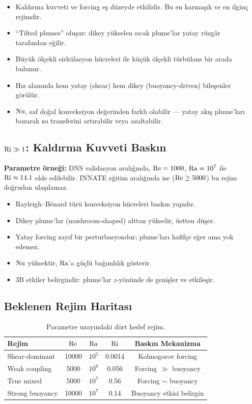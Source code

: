 \begin{itemize}
    \item Kaldırma kuvveti ve forcing eş düzeyde etkilidir. Bu en karmaşık ve en ilginç rejimdir.
    \item ``Tilted plumes'' oluşur: dikey yükselen sıcak plume'lar yatay rüzgâr tarafından eğilir.
    \item Büyük ölçekli sirkülasyon hücreleri ile küçük ölçekli türbülans bir arada bulunur.
    \item Hız alanında hem yatay (shear) hem dikey (buoyancy-driven) bileşenler görülür.
    \item $\mathrm{Nu}$, saf doğal konveksiyon değerinden farklı olabilir --- yatay akış plume'ları bozarak ısı transferini artırabilir veya azaltabilir.
\end{itemize}

\subsection{$\mathrm{Ri} \gg 1$: Kaldırma Kuvveti Baskın}

\textbf{Parametre örneği:} DNS validasyon aralığında, $\mathrm{Re} = 1000$, $\mathrm{Ra} = 10^7$ ile $\mathrm{Ri} \approx 14.1$ elde edilebilir. INNATE eğitim aralığında ise ($\mathrm{Re} \geq 5000$) bu rejim doğrudan ulaşılamaz.

\begin{itemize}
    \item Rayleigh--B\'{e}nard türü konveksiyon hücreleri baskın yapıdır.
    \item Dikey plume'lar (mushroom-shaped) alttan yükselir, üstten düşer.
    \item Yatay forcing zayıf bir perturbasyondur; plume'ları hafifçe eğer ama yok edemez.
    \item $\mathrm{Nu}$ yüksektir, $\mathrm{Ra}$'a güçlü bağımlılık gösterir.
    \item 3B etkiler belirgindir: plume'lar $z$-yönünde de genişler ve etkileşir.
\end{itemize}

\subsection{Beklenen Rejim Haritası}

\begin{table}[H]
\centering
\caption{Parametre uzayındaki dört hedef rejim.}
\label{tab:regimes}
\begin{tabular}{lcccc}
\toprule
\textbf{Rejim} & $\mathrm{Re}$ & $\mathrm{Ra}$ & $\mathrm{Ri}$ & \textbf{Baskın Mekanizma} \\
\midrule
Shear-dominant    & 10000 & $10^5$ & 0.0014 & Kolmogorov forcing \\
Weak coupling     & 5000  & $10^6$ & 0.056  & Forcing $\gg$ buoyancy \\
True mixed        & 5000  & $10^7$ & 0.56   & Forcing $\sim$ buoyancy \\
Strong buoyancy   & 10000 & $10^7$ & 0.14   & Buoyancy etkisi belirgin \\
\bottomrule
\end{tabular}
\end{table}


